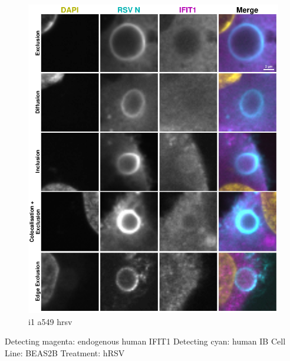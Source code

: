 \begin{figure}
    \centering
    \includegraphics[width=1\linewidth]{09. Chapter 4/Figs/02. Infection/01. IFIT1/03. a549 i1.pdf}
    \caption[i1 a549 hrsv]{i1 a549 hrsv}
    \label{fig:i1 a549 hrsv}
\end{figure}


Detecting magenta: endogenous human IFIT1 \newline
Detecting cyan: human IB \newline
Cell Line: BEAS2B \newline
Treatment: hRSV \newline

